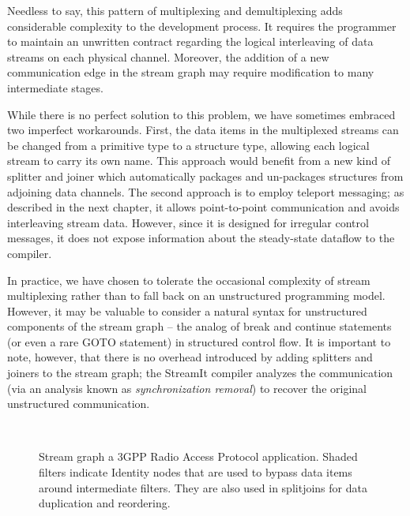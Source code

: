 \begin{enumerate}
  Needless to say, this pattern of multiplexing and demultiplexing
  adds considerable complexity to the development process.  It
  requires the programmer to maintain an unwritten contract regarding
  the logical interleaving of data streams on each physical channel.
  Moreover, the addition of a new communication edge in the stream
  graph may require modification to many intermediate stages.

  While there is no perfect solution to this problem, we have
  sometimes embraced two imperfect workarounds.  First, the data items
  in the multiplexed streams can be changed from a primitive type to a
  structure type, allowing each logical stream to carry its own name.
  This approach would benefit from a new kind of splitter and joiner
  which automatically packages and un-packages structures from
  adjoining data channels.  The second approach is to employ teleport
  messaging; as described in the next chapter, it allows
  point-to-point communication and avoids interleaving stream data.
  However, since it is designed for irregular control messages, it
  does not expose information about the steady-state dataflow to the
  compiler.

  In practice, we have chosen to tolerate the occasional complexity of
  stream multiplexing rather than to fall back on an unstructured
  programming model.  However, it may be valuable to consider a
  natural syntax for unstructured components of the stream graph --
  the analog of break and continue statements (or even a rare GOTO
  statement) in structured control flow. It is important to note,
  however, that there is no overhead introduced by adding splitters
  and joiners to the stream graph; the StreamIt compiler analyzes the
  communication (via an analysis known as {\it synchronization
  removal}) to recover the original unstructured communication.

\begin{figure}[t!]
\vspace{-1.25in} ~ \\
\begin{minipage}{4in}
\caption[Stream graph for 3GPP]{Stream graph a 3GPP Radio Access
  Protocol application.  Shaded filters indicate Identity nodes that
  are used to bypass data items around intermediate filters.  They are
  also used in splitjoins for data duplication and
  reordering.\protect\label{fig:3gpp}}
\end{minipage}
\end{figure}


\end{enumerate}
